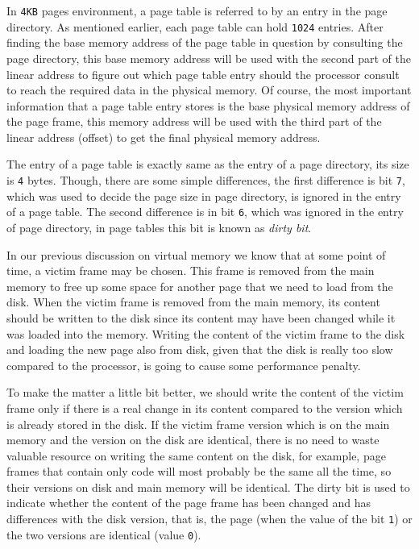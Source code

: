 In \lstinline!4KB! pages environment, a page table is referred to by an
entry in the page directory. As mentioned earlier, each page table can
hold \lstinline!1024! entries. After finding the base memory address of
the page table in question by consulting the page directory, this base
memory address will be used with the second part of the linear address
to figure out which page table entry should the processor consult to
reach the required data in the physical memory. Of course, the most
important information that a page table entry stores is the base
physical memory address of the page frame, this memory address will be
used with the third part of the linear address (offset) to get the final
physical memory address.

The entry of a page table is exactly same as the entry of a page
directory, its size is \lstinline!4! bytes. Though, there are some
simple differences, the first difference is bit \lstinline!7!, which was
used to decide the page size in page directory, is ignored in the entry
of a page table. The second difference is in bit \lstinline!6!, which
was ignored in the entry of page directory, in page tables this bit is
known as \emph{dirty bit}.

In our previous discussion on virtual memory we know that at some point
of time, a victim frame may be chosen. This frame is removed from the
main memory to free up some space for another page that we need to load
from the disk. When the victim frame is removed from the main memory,
its content should be written to the disk since its content may have
been changed while it was loaded into the memory. Writing the content of
the victim frame to the disk and loading the new page also from disk,
given that the disk is really too slow compared to the processor, is
going to cause some performance penalty.

To make the matter a little bit better, we should write the content of
the victim frame only if there is a real change in its content compared
to the version which is already stored in the disk. If the victim frame
version which is on the main memory and the version on the disk are
identical, there is no need to waste valuable resource on writing the
same content on the disk, for example, page frames that contain only
code will most probably be the same all the time, so their versions on
disk and main memory will be identical. The dirty bit is used to
indicate whether the content of the page frame has been changed and has
differences with the disk version, that is, the page (when the value of
the bit \lstinline!1!) or the two versions are identical (value
\lstinline!0!).

